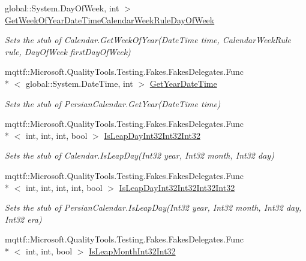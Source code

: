 \begin{DoxyCompactItemize}
global\-::\-System.\-Day\-Of\-Week, int $>$ \hyperlink{class_system_1_1_globalization_1_1_fakes_1_1_stub_persian_calendar_a595e80d4141605a1f3f741a6c4f83430}{Get\-Week\-Of\-Year\-Date\-Time\-Calendar\-Week\-Rule\-Day\-Of\-Week}
\begin{DoxyCompactList}\small\item\em Sets the stub of Calendar.\-Get\-Week\-Of\-Year(\-Date\-Time time, Calendar\-Week\-Rule rule, Day\-Of\-Week first\-Day\-Of\-Week)\end{DoxyCompactList}\item 
mqttf\-::\-Microsoft.\-Quality\-Tools.\-Testing.\-Fakes.\-Fakes\-Delegates.\-Func\\*
$<$ global\-::\-System.\-Date\-Time, int $>$ \hyperlink{class_system_1_1_globalization_1_1_fakes_1_1_stub_persian_calendar_af07039010bdbe2e47bbbf1ec5b6cac75}{Get\-Year\-Date\-Time}
\begin{DoxyCompactList}\small\item\em Sets the stub of Persian\-Calendar.\-Get\-Year(\-Date\-Time time)\end{DoxyCompactList}\item 
mqttf\-::\-Microsoft.\-Quality\-Tools.\-Testing.\-Fakes.\-Fakes\-Delegates.\-Func\\*
$<$ int, int, int, bool $>$ \hyperlink{class_system_1_1_globalization_1_1_fakes_1_1_stub_persian_calendar_a184e868dd60c78547bd7365e1327fe32}{Is\-Leap\-Day\-Int32\-Int32\-Int32}
\begin{DoxyCompactList}\small\item\em Sets the stub of Calendar.\-Is\-Leap\-Day(\-Int32 year, Int32 month, Int32 day)\end{DoxyCompactList}\item 
mqttf\-::\-Microsoft.\-Quality\-Tools.\-Testing.\-Fakes.\-Fakes\-Delegates.\-Func\\*
$<$ int, int, int, int, bool $>$ \hyperlink{class_system_1_1_globalization_1_1_fakes_1_1_stub_persian_calendar_a68004e52978ae4cfe26b5be004e2e14f}{Is\-Leap\-Day\-Int32\-Int32\-Int32\-Int32}
\begin{DoxyCompactList}\small\item\em Sets the stub of Persian\-Calendar.\-Is\-Leap\-Day(\-Int32 year, Int32 month, Int32 day, Int32 era)\end{DoxyCompactList}\item 
mqttf\-::\-Microsoft.\-Quality\-Tools.\-Testing.\-Fakes.\-Fakes\-Delegates.\-Func\\*
$<$ int, int, bool $>$ \hyperlink{class_system_1_1_globalization_1_1_fakes_1_1_stub_persian_calendar_ab1880c346e5f18075bf8aff29b21cd6c}{Is\-Leap\-Month\-Int32\-Int32}

\end{DoxyCompactItemize}
